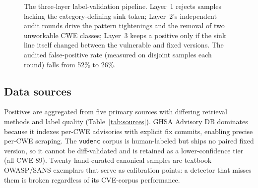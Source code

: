 \documentclass[conference]{IEEEtran}
\begin{document}
\begin{figure}[t]
\centering
{}
\caption{The three-layer label-validation pipeline. Layer~1 rejects
samples lacking the category-defining sink token; Layer~2's independent
audit rounds drive the pattern tightenings and the removal of two
unworkable CWE classes; Layer~3 keeps a positive only if the sink line
itself changed between the vulnerable and fixed versions. The audited
false-positive rate (measured on disjoint samples each round) falls from
52\% to 26\%.}
\label{fig:pipeline}
\end{figure}

\subsection{Data sources}
Positives are aggregated from five primary sources with differing
retrieval methods and label quality (Table~\ref{tab:sources}). GHSA
Advisory DB dominates because it indexes per-CWE advisories with explicit
fix commits, enabling precise per-CWE scraping. The \texttt{vudenc}
corpus is human-labeled but ships no paired fixed version, so it cannot
be diff-validated and is retained as a lower-confidence tier (all
CWE-89). Twenty hand-curated canonical samples are textbook OWASP/SANS
exemplars that serve as calibration points: a detector that misses them
is broken regardless of its CVE-corpus performance.
\end{document}

